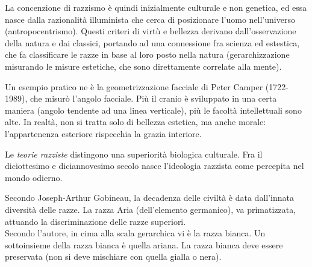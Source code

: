 \documentclass[a4paper]{article}
\begin{document}
La concenzione di razzismo è quindi inizialmente culturale e non genetica,
ed essa nasce dalla razionalità illuminista che cerca di posizionare l'uomo nell'universo (antropocentrismo).
Questi criteri di virtù e bellezza derivano dall'osservazione della natura e dai classici,
portando ad una connessione fra scienza ed estestica, che fa classificare le razze
in base al loro posto nella natura (gerarchizzazione misurando le misure estetiche, che
sono direttamente correlate alla mente).

Un esempio pratico ne è la geometrizzazione facciale di Peter Camper (1722-1989),
che misurò l'angolo facciale. Più il cranio è sviluppato in una certa maniera (angolo tendente ad una linea verticale),
più le facoltà intellettuali sono alte. In realtà, non si
tratta solo di bellezza estetica, ma anche morale: l'appartenenza esteriore rispecchia
la grazia interiore.


Le \textit{teorie razziste} distingono una superiorità biologica culturale.
Fra il diciottesimo e diciannovesimo secolo nasce l'ideologia razzista come percepita nel mondo odierno.

Secondo Joseph-Arthur Gobineau, la decadenza delle civiltà è data dall'innata
diversità delle razze. La razza Aria (dell'elemento germanico),
va primatizzata, attuando la discriminazione delle razze superiori.\\
Secondo l'autore, in cima alla scala gerarchica vi è la razza bianca.
Un sottoinsieme della razza bianca è quella ariana.
La razza bianca deve essere preservata (non si deve mischiare con quella gialla o nera).

\end{document}
